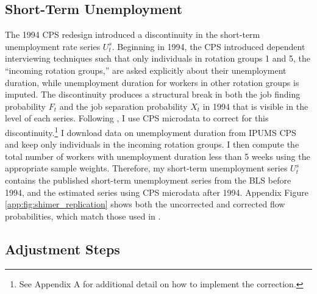 \documentclass[12pt]{article}
\begin{document}
\subsection{Short-Term Unemployment}

The 1994 CPS redesign introduced a discontinuity in the short-term unemployment rate series $U^s_t$. Beginning in 1994, the CPS introduced dependent interviewing techniques such that only individuals in rotation groups 1 and 5, the ``incoming rotation groups,'' are asked explicitly about their unemployment duration, while unemployment duration for workers in other rotation groups is imputed. The discontinuity produces a structural break in both the job finding probability $F_t$ and the job separation probability $X_t$ in 1994 that is visible in the level of each series. Following \cite{Shimer:2012aa}, I use CPS microdata to correct for this discontinuity.\footnote{See \cite{Shimer:2012aa} Appendix A for additional detail on how to implement the correction.} I download data on unemployment duration from IPUMS CPS and keep only individuals in the incoming rotation groups. I then compute the total number of workers with unemployment duration less than 5 weeks using the appropriate sample weights. Therefore, my short-term unemployment series $U_t^s$ contains the published short-term unemployment series from the BLS before 1994, and the estimated series using CPS microdata after 1994. Appendix Figure \ref{app:fig:shimer_replication} shows both the uncorrected and corrected flow probabilities, which match those used in \cite{Shimer:2012aa}.

\subsection{Adjustment Steps}
\end{document}
